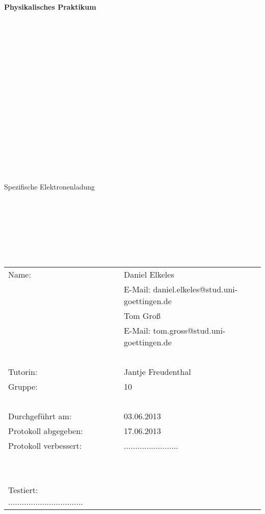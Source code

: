 \thispagestyle{empty}
\begin{center}
    {\Huge{\textbf{Physikalisches Praktikum}}}\\[16pt]
\ \\
\ \\
\ \\
\ \\
\ \\
\ \\
\ \\
\ \\
\ \\
\ \\
\ \\
\ \\
\ \\
\ \\
\ \\
\ \\
\ \\
\huge{Spezifische Elektronenladung}
\ \\
\ \\
\large{}
\end{center}

\normalsize
\ \\
\ \\
\ \\
\ \\
\ \\

\begin{center}
\begin{tabular}{lcl}
      Name: & ~ & Daniel Elkeles \\
                    & ~ & E-Mail: daniel.elkeles@stud.uni-goettingen.de \\
	  		& ~ & Tom Groß \\
		    		& ~ & E-Mail: tom.gross@stud.uni-goettingen.de \\
\ \\		    
      Tutorin: & ~ & Jantje Freudenthal \\
      Gruppe: & ~ & 10 \\
\ \\      
      Durchgeführt am: & ~ & 03.06.2013 \\
      Protokoll abgegeben: & ~ & 17.06.2013 \\
      Protokoll verbessert: & ~ & ........................\\
\ \\
\ \\
      Testiert: .................................    
\end{tabular}\\
\end{center}
